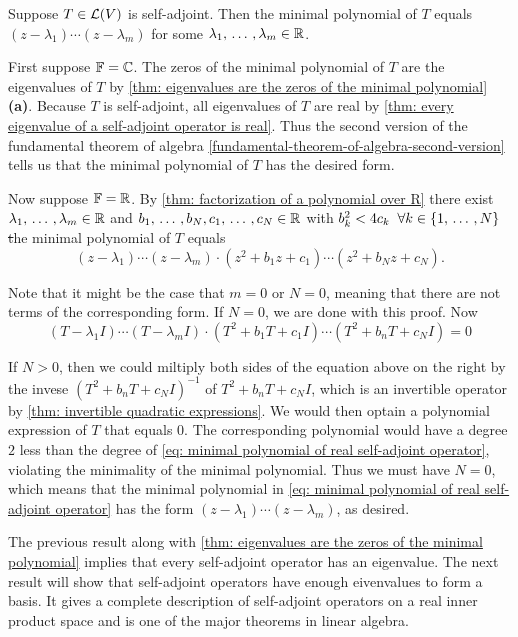 \begin{thm}
  Suppose $T \in \mathcal{L}(V)$ is self-adjoint. Then the minimal polynomial of $T$ equals $(z-\lambda_1) \cdots (z-\lambda_m)$ for some $\lambda_1, {\, \ldots \,\,}, \lambda_m \in \mathbb{R}$.
\end{thm}
\begin{prf}
  First suppose $\mathbb{F} = \mathbb{C}$. The zeros of the minimal polynomial of $T$ are the eigenvalues of $T$ by \ref{thm: eigenvalues are the zeros of the minimal polynomial} \textbf{(a)}. Because $T$ is self-adjoint, all eigenvalues of $T$ are real by \ref{thm: every eigenvalue of a self-adjoint operator is real}. Thus the second version of the fundamental theorem of algebra \ref{fundamental-theorem-of-algebra-second-version} tells us that the minimal polynomial of $T$ has the desired form.

  Now suppose $\mathbb{F} = \mathbb{R}$. By \ref{thm: factorization of a polynomial over R} there exist $\lambda_1, {\, \ldots \,\,}, \lambda_m \in \mathbb{R}$ and $b_1, {\, \ldots \,\,}, b_N, c_1, {\, \ldots \,\,}, c_N \in \mathbb{R}$ with $b_k^2 < 4c_k \; \; \forall k \in \{1, {\, \ldots \,\,}, N \}$ \st the minimal polynomial of $T$ equals
  \begin{equation}
    \label{eq: minimal polynomial of real self-adjoint operator}
    (z-\lambda_1)\cdots(z-\lambda_m)\cdot(z^2+b_1z+c_1) \cdots (z^2+b_Nz+c_N).
  \end{equation}

  Note that it might be the case that $m=0$ or $N=0$, meaning that there are not terms of the corresponding form. If $N=0$, we are done with this proof. Now
  \[
  (T-\lambda_1I) \cdots (T-\lambda_m I)\cdot(T^2 + b_1 T + c_1I)\cdots(T^2 + b_nT + c_NI) = 0
  \]

  If $N>0$, then we could miltiply both sides of the equation above on the right by the invese $(T^2+b_nT+c_NI)^{-1}$ of $T^2+b_nT+c_NI$, which is an invertible operator by \ref{thm: invertible quadratic expressions}. We would then optain a polynomial expression of $T$ that equals $0$. The corresponding polynomial would have a degree $2$ less than the degree of \eqref{eq: minimal polynomial of real self-adjoint operator}, violating the minimality of the minimal polynomial. Thus we must have $N=0$, which means that the minimal polynomial in \eqref{eq: minimal polynomial of real self-adjoint operator} has the form $(z-\lambda_1)\cdots(z-\lambda_m)$, as desired.
\end{prf}

The previous result along with \ref{thm: eigenvalues are the zeros of the minimal polynomial} implies that every self-adjoint operator has an eigenvalue. The next result will show that self-adjoint operators have enough eivenvalues to form a basis. It gives a complete description of self-adjoint operators on a real inner product space and is one of the major theorems in linear algebra.

